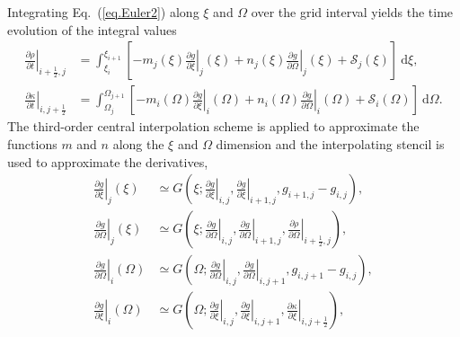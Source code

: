 \documentclass[times,12pt,3p,longtitle]{elsarticle}
\begin{document}
Integrating Eq.~(\ref{eq.Euler2}) along $\xi$ and $\Omega$ over the grid interval  yields the time evolution of the integral values \cite{imadera2009}
\begin{equation}\label{eq.line}
    \begin{aligned}
    \left.\frac{\partial \rho}{\partial t}\right|_{i+\frac{1}{2},j} &= \int_{\xi_i}^{\xi_{i+1}}[ - m_j(\xi) \left.\frac{\partial g}{\partial \xi}\right|_{j}(\xi) + n_j(\xi) \left.\frac{\partial g}{\partial \Omega}\right|_{j}(\xi) + \mathcal{S}_j(\xi)]~\mathrm{d} \xi,
    \\
    \left.\frac{\partial \kappa}{\partial t}\right|_{i,j+\frac{1}{2}}
    &= \int_{\Omega_j}^{\Omega_{j+1}}[ - m_i(\Omega) \left.\frac{\partial g}{\partial \xi}\right|_{i}(\Omega) + n_i(\Omega) \left.\frac{\partial g}{\partial \Omega}\right|_{i}(\Omega) + \mathcal{S}_i(\Omega)]~\mathrm{d} \Omega.
    \end{aligned}
\end{equation}
The third-order central interpolation scheme is applied to approximate the functions $m$ and $n$ along the $\xi$ and $\Omega$ dimension and the interpolating stencil is used to approximate the derivatives, 
\begin{equation}
    \begin{aligned}
       \left.\frac{\partial g}{\partial \xi}\right|_{j}(\xi)
        &\simeq G\left(\xi;\left.\frac{\partial g}{\partial \xi}\right|_{i,j},\left.\frac{\partial g}{\partial \xi}\right|_{i+1,j},g_{i+1,j}-g_{i,j}\right),
        \\
        \left.\frac{\partial g}{\partial \Omega}\right|_{j}(\xi)
         &\simeq G\left(\xi;\left.\frac{\partial g}{\partial \Omega}\right|_{i,j},\left.\frac{\partial g}{\partial \Omega}\right|_{i+1,j},    \left.\frac{\partial \rho}{\partial \Omega}\right|_{i+\frac{1}{2},j}\right),
         \\
         \left.\frac{\partial g}{\partial \Omega}\right|_{i}(\Omega) 
     &\simeq G\left(\Omega;\left.\frac{\partial g}{\partial \Omega}\right|_{i,j},\left.\frac{\partial g}{\partial \Omega}\right|_{i,j+1},g_{i,j+1}-g_{i,j}\right),\\
         \left.\frac{\partial g}{\partial \xi}\right|_{i}(\Omega) 
  &\simeq G\left(\Omega;\left.\frac{\partial g}{\partial \xi}\right|_{i,j},\left.\frac{\partial g}{\partial \xi}\right|_{i,j+1},\left.\frac{\partial \kappa}{\partial \xi}\right|_{i,j+\frac{1}{2}}\right),
    \end{aligned}
\end{equation}
\end{document}
